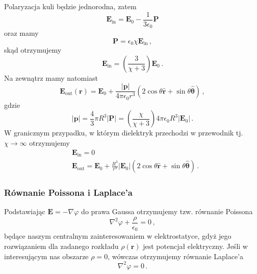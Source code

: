 \documentclass[../main.tex]{subfiles}
\begin{document}
\begin{enumerate}
\noindent Polaryzacja kuli będzie jednorodna, zatem
\begin{equation*}
    \mathbf{E}_\text{in}=\mathbf{E}_0-\frac{1}{3\epsilon_0}\mathbf{P}
\end{equation*}
oraz mamy
\begin{equation*}
    \mathbf{P}=\epsilon_0\chi\mathbf{E}_\text{in}\,,
\end{equation*}
skąd otrzymujemy
\begin{equation*}
    \mathbf{E}_\text{in}=\left(\frac{3}{\chi+3}\right)\mathbf{E}_0\,.
\end{equation*}
Na zewnątrz mamy natomiast
\begin{equation*}
    \mathbf{E}_\text{out}(\mathbf{r})=\mathbf{E}_0+\frac{|\mathbf{p}|}{4\pi\epsilon_0r^3}(2\cos\theta\mathbf{\hat{r}}+\sin\theta\boldsymbol{\hat{\theta}})\,,
\end{equation*}
gdzie
\begin{equation*}
    |\mathbf{p}|=\frac{4}{3}\pi R^3|\mathbf{P}|=\left(\frac{\chi}{\chi+3}\right)4\pi\epsilon_0R^3|\mathbf{E}_0|\,.
\end{equation*}
W granicznym przypadku, w którym dielektryk przechodzi w przewodnik tj. \(\chi\to\infty\) otrzymujemy
\begin{equation*}
    \begin{split}
        &\mathbf{E}_\text{in}=0\\
        &\mathbf{E}_\text{out}=\mathbf{E}_0+\frac{R^3}{r^3}|\mathbf{E}_0|(2\cos\theta\mathbf{\hat{r}}+\sin\theta\boldsymbol{\hat{\theta}})\,.
    \end{split}
\end{equation*}
\end{enumerate}

\subsubsection{Równanie Poissona i Laplace'a}
Podstawiając \(\mathbf{E}=-\nabla\varphi\) do prawa Gaussa otrzymujemy tzw. równanie Poissona
\begin{equation*}
    \nabla ^2\varphi+\frac{\rho}{\epsilon_0}=0\,,
\end{equation*}
będące naszym centralnym zainteresowaniem w elektrostatyce, gdyż jego rozwiązaniem dla zadanego rozkładu \(\rho(\mathbf{r})\) jest potencjał elektryczny. Jeśli w interesującym nas obszarze \(\rho=0\), wówczas otrzymujemy równanie Laplace'a
\begin{equation*}
    \nabla^2\varphi=0\,.
\end{equation*}
\end{document}
